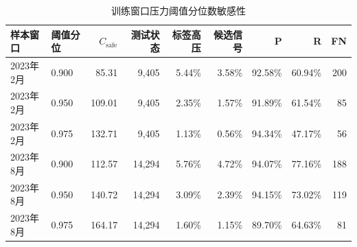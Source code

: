 \begin{table}[H]
\centering
\small
\caption{训练窗口压力阈值分位数敏感性}
\label{tab:threshold-sensitivity}
\begin{tabular}{llrrrrrrr}
\toprule
样本窗口 & 阈值分位 & $C_{\mathrm{safe}}$ & 测试状态 & 标签高压 & 候选信号 & P & R & FN \\
\midrule
2023年2月 & 0.900 & 85.31 & 9,405 & 5.44\% & 3.58\% & 92.58\% & 60.94\% & 200 \\
2023年2月 & 0.950 & 109.01 & 9,405 & 2.35\% & 1.57\% & 91.89\% & 61.54\% & 85 \\
2023年2月 & 0.975 & 132.71 & 9,405 & 1.13\% & 0.56\% & 94.34\% & 47.17\% & 56 \\
2023年8月 & 0.900 & 112.57 & 14,294 & 5.76\% & 4.72\% & 94.07\% & 77.16\% & 188 \\
2023年8月 & 0.950 & 140.72 & 14,294 & 3.09\% & 2.39\% & 94.15\% & 73.02\% & 119 \\
2023年8月 & 0.975 & 164.17 & 14,294 & 1.60\% & 1.15\% & 89.70\% & 64.63\% & 81 \\
\bottomrule
\end{tabular}
\end{table}

